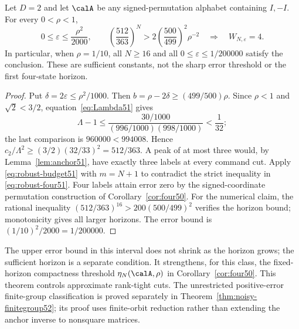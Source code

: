 \begin{corollary}
\label{cor:robust-four51}
Let $D=2$ and let $\calA$ be any signed-permutation alphabet containing
$I,-I$. For every $0<\rho<1$,
\begin{equation}\label{eq:robust-four51}
 0\le\varepsilon\le\frac{\rho^2}{2000},\qquad
 \left(\frac{512}{363}\right)^N>
       2\left(\frac{500}{499}\right)^2\rho^{-2}
 \quad\Longrightarrow\quad W_{N,\varepsilon}=4.
\end{equation}
In particular, when $\rho=1/10$, all $N\ge16$ and all
$0\le\varepsilon\le1/200000$ satisfy the conclusion. These are
sufficient constants, not the sharp error threshold or the first
four-state horizon.
\end{corollary}
\begin{proof}
Put $\delta=2\varepsilon\le\rho^2/1000$. Then
$b=\rho-2\delta\ge(499/500)\rho$. Since $\rho<1$ and
$\sqrt2<3/2$, equation~\eqref{eq:Lambda51} gives
\[
 \Lambda-1\le
 \frac{30/1000}{(996/1000)(998/1000)}<\frac1{32};
\]
the last comparison is $960000<994008$. Hence
$c_2/\Lambda^2\ge(3/2)(32/33)^2=512/363$.
A peak of at most three would, by Lemma~\ref{lem:anchor51}, have
exactly three labels at every command cut. Apply
\eqref{eq:robust-budget51} with $m=N+1$ to contradict the strict
inequality in \eqref{eq:robust-four51}. Four labels attain error
zero by the signed-coordinate permutation construction of
Corollary~\ref{cor:four50}.
For the numerical claim, the rational inequality
$(512/363)^{16}>200(500/499)^2$ verifies the horizon bound;
monotonicity gives all larger horizons. The error bound is
$(1/10)^2/2000=1/200000$.
\end{proof}

The upper error bound in this interval does not shrink as the horizon
grows; the sufficient horizon is a separate condition. It strengthens,
for this class, the fixed-horizon compactness threshold
$\eta_N(\calA,\rho)$ in Corollary~\ref{cor:four50}. This theorem controls approximate rank-tight cuts. The unrestricted
positive-error finite-group classification is proved separately in
Theorem~\ref{thm:noisy-finitegroup52}; its proof uses finite-orbit
reduction rather than extending the anchor inverse to nonsquare matrices.
